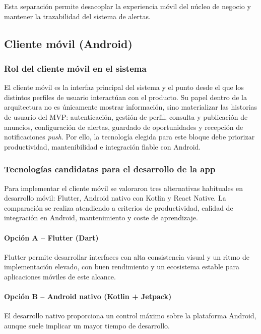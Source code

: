 \documentclass[12pt,a4paper]{report}
\begin{document}
Esta separación permite desacoplar la experiencia móvil del núcleo de negocio y mantener la trazabilidad del sistema de alertas.

\subsection{Cliente móvil (Android)}

\subsubsection{Rol del cliente móvil en el sistema}
El cliente móvil es la interfaz principal del sistema y el punto desde el que los distintos perfiles de usuario interactúan con el producto. Su papel dentro de la arquitectura no es únicamente mostrar información, sino materializar las historias de usuario del MVP: autenticación, gestión de perfil, consulta y publicación de anuncios, configuración de alertas, guardado de oportunidades y recepción de notificaciones \textit{push}. Por ello, la tecnología elegida para este bloque debe priorizar productividad, mantenibilidad e integración fiable con Android.

\subsubsection{Tecnologías candidatas para el desarrollo de la app}
Para implementar el cliente móvil se valoraron tres alternativas habituales en desarrollo móvil: Flutter, Android nativo con Kotlin y React Native. La comparación se realiza atendiendo a criterios de productividad, calidad de integración en Android, mantenimiento y coste de aprendizaje.

\paragraph{Opción A -- Flutter (Dart)}
Flutter permite desarrollar interfaces con alta consistencia visual y un ritmo de implementación elevado, con buen rendimiento y un ecosistema estable para aplicaciones móviles de este alcance.

\paragraph{Opción B -- Android nativo (Kotlin + Jetpack)}
El desarrollo nativo proporciona un control máximo sobre la plataforma Android, aunque suele implicar un mayor tiempo de desarrollo.
\end{document}
